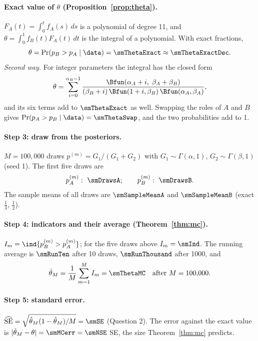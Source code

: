 \paragraph{Exact value of $\theta$ (Proposition~\ref{prop:theta}).}
$F_A(t)=\int_0^t f_A(s)\,ds$ is a polynomial of degree 11, and $\theta=\int_0^1 f_B(t)F_A(t)\,dt$ is the integral
of a polynomial. With exact fractions,
\[
\theta=\Pr(p_B>p_A\mid\data)=\smThetaExact\approx\smThetaExactDec .
\]
\emph{Second way.} For integer parameters the integral has the closed form
\[
\theta=\sum_{i=0}^{\alpha_B-1}\frac{\Bfun(\alpha_A+i,\;\beta_A+\beta_B)}{(\beta_B+i)\,\Bfun(1+i,\beta_B)\,\Bfun(\alpha_A,\beta_A)},
\]
and its six terms add to $\smThetaExact$ as well. Swapping the roles of $A$ and $B$ gives
$\Pr(p_A>p_B\mid\data)=\smThetaSwap$, and the two probabilities add to 1.

\paragraph{Step 3: draw from the posteriors.}
$M=100{,}000$ draws $p^{(m)}=G_1/(G_1+G_2)$ with $G_1\sim\Gamma(\alpha,1)$, $G_2\sim\Gamma(\beta,1)$ (seed 1).
The first five draws are
\[
p_A^{(m)}:\ \smDrawsA;\qquad p_B^{(m)}:\ \smDrawsB .
\]
The sample means of all draws are $\smSampleMeanA$ and $\smSampleMeanB$ (exact $\frac13$, $\frac12$).

\paragraph{Step 4: indicators and their average (Theorem~\ref{thm:mc}).}
$I_m=\ind{p_B^{(m)}>p_A^{(m)}}$; for the five draws above $I_m=\smInd$. The running average is $\smRunTen$ after
10 draws, $\smRunThousand$ after 1000, and
\[
\hat\theta_M=\frac1M\sum_{m=1}^M I_m=\smThetaMC \quad\text{after } M=100{,}000 .
\]

\paragraph{Step 5: standard error.}
$\widehat{\mathrm{SE}}=\sqrt{\hat\theta_M(1-\hat\theta_M)/M}=\smSE$ (Question 2). The error against the exact
value is $|\hat\theta_M-\theta|=\smMCerr=\smNSE$ SE, the size Theorem~\ref{thm:mc} predicts.

